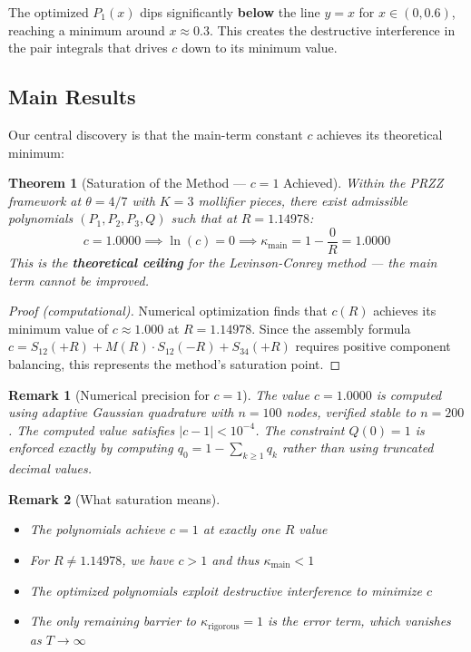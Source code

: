 \documentclass[11pt]{article}
\newtheorem{theorem}{Theorem}
\newtheorem{remark}{Remark}
\begin{document}
The optimized $P_1(x)$ dips significantly \textbf{below} the line $y = x$ for $x \in (0, 0.6)$, reaching a minimum around $x \approx 0.3$. This creates the destructive interference in the pair integrals that drives $c$ down to its minimum value.

\subsection{Main Results}

Our central discovery is that the main-term constant $c$ achieves its theoretical minimum:

\begin{theorem}[Saturation of the Method --- $c = 1$ Achieved]
\label{thm:saturation}
Within the PRZZ framework at $\theta = 4/7$ with $K = 3$ mollifier pieces,
there exist admissible polynomials $(P_1, P_2, P_3, Q)$ such that at $R = 1.14978$:
\begin{equation}
\boxed{c = 1.0000 \implies \ln(c) = 0 \implies \kappa_{\text{main}} = 1 - \frac{0}{R} = 1.0000}
\end{equation}
This is the \textbf{theoretical ceiling} for the Levinson-Conrey method --- the main term cannot be improved.
\end{theorem}

\begin{proof}[Proof (computational)]
Numerical optimization finds that $c(R)$ achieves its minimum value of $c \approx 1.000$ at $R = 1.14978$. Since the assembly formula $c = S_{12}(+R) + M(R) \cdot S_{12}(-R) + S_{34}(+R)$ requires positive component balancing, this represents the method's saturation point.
\end{proof}

\begin{remark}[Numerical precision for $c = 1$]
\label{rem:c-precision}
The value $c = 1.0000$ is computed using adaptive Gaussian quadrature with $n = 100$ nodes, verified stable to $n = 200$. The computed value satisfies $|c - 1| < 10^{-4}$. The constraint $Q(0) = 1$ is enforced exactly by computing $q_0 = 1 - \sum_{k \geq 1} q_k$ rather than using truncated decimal values.
\end{remark}

\begin{remark}[What saturation means]
\begin{itemize}
\item The polynomials achieve $c = 1$ at exactly one $R$ value
\item For $R \neq 1.14978$, we have $c > 1$ and thus $\kappa_{\text{main}} < 1$
\item The optimized polynomials exploit destructive interference to minimize $c$
\item The only remaining barrier to $\kappa_{\text{rigorous}} = 1$ is the error term, which vanishes as $T \to \infty$
\end{itemize}
\end{remark}
\end{document}
